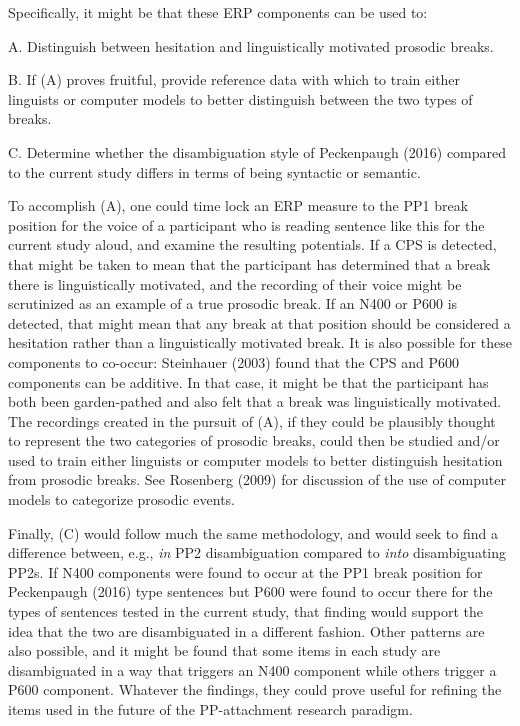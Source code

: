 \documentclass[11pt,oneside]{book}
\begin{document}
Specifically, it might be that these ERP components can be used to:

A. Distinguish between hesitation and linguistically motivated prosodic breaks.

B. If (A) proves fruitful, provide reference data with which to train either linguists or computer models to better distinguish between the two types of breaks.

C. Determine whether the disambiguation style of Peckenpaugh (2016) compared to the current study differs in terms of being syntactic or semantic.

To accomplish (A), one could time lock an ERP measure to the PP1 break position for the voice of a participant who is reading sentence like this for the current study aloud, and examine the resulting potentials. If a CPS is detected, that might be taken to mean that the participant has determined that a break there is linguistically motivated, and the recording of their voice might be scrutinized as an example of a true prosodic break. If an N400 or P600 is detected, that might mean that any break at that position should be considered a hesitation rather than a linguistically motivated break. It is also possible for these components to co-occur: Steinhauer (2003) found that the CPS and P600 components can be additive. In that case, it might be that the participant has both been garden-pathed and also felt that a break was linguistically motivated. The recordings created in the pursuit of (A), if they could be plausibly thought to represent the two categories of prosodic breaks, could then be studied and/or used to train either linguists or computer models to better distinguish hesitation from prosodic breaks. See Rosenberg (2009) for discussion of the use of computer models to categorize prosodic events.

Finally, (C) would follow much the same methodology, and would seek to find a difference between, e.g., \emph{in} PP2 disambiguation compared to \emph{into} disambiguating PP2s. If N400 components were found to occur at the PP1 break position for Peckenpaugh (2016) type sentences but P600 were found to occur there for the types of sentences tested in the current study, that finding would support the idea that the two are disambiguated in a different fashion. Other patterns are also possible, and it might be found that some items in each study are disambiguated in a way that triggers an N400 component while others trigger a P600 component. Whatever the findings, they could prove useful for refining the items used in the future of the PP-attachment research paradigm.
\end{document}
